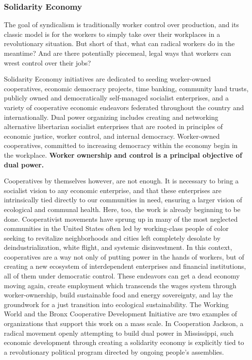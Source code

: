 \documentclass[10pt]{memoir}
\def \href #1#2{#2} %
\begin{document}
\subsubsection{Solidarity Economy}\label{solidarity-economy}

The goal of syndicalism is traditionally worker control over production,
and its classic model is for the workers to simply take over their
workplaces in a revolutionary situation. But short of that, what can
radical workers do in the meantime? And are there potentially piecemeal,
legal ways that workers can wrest control over their jobs?

Solidarity Economy initiatives are dedicated to seeding worker-owned
cooperatives, economic democracy projects, time banking, community land
trusts, publicly owned and democratically self-managed socialist
enterprises, and a variety of cooperative economic endeavors federated
throughout the country and internationally. Dual power organizing
includes creating and networking alternative libertarian socialist
enterprises that are rooted in principles of economic justice, worker
control, and internal democracy. Worker-owned cooperatives, committed to
increasing democracy within the economy begin in the workplace.
\textbf{Worker ownership and control is a principal objective of dual
power.}

Cooperatives by themselves however, are not enough. It is necessary to
bring a socialist vision to any economic enterprise, and that these
enterprises are intrinsically tied directly to our communities in need,
ensuring a larger vision of ecological and communal health. Here, too,
the work is already beginning to be done. Cooperativist movements have
sprung up in many of the most neglected communities in the United States
often led by working-class people of color seeking to revitalize
neighborhoods and cities left completely desolate by
deindustrialization, white flight, and systemic disinvestment. In this
context, cooperatives are a way not only of putting power in the hands
of workers, but of creating a new ecosystem of interdependent
enterprises and financial institutions, all of them under democratic
control. These endeavors can get a dead economy moving again, create
employment which transcends the wages system through worker-ownership,
build sustainable food and energy sovereignty, and lay the groundwork
for a just transition into ecological sustainability.
\href{https://www.theworkingworld.org/us/}{The Working World} and the
\href{https://bcdi.nyc/}{Bronx Cooperative Development Initiative} are
two examples of organizations that support this work on a mass scale. In
\href{https://cooperationjackson.org/}{Cooperation Jackson}, a radical
movement openly attempting to build dual power in Mississippi, such
economic development through creating a solidarity economy is
\href{https://static1.squarespace.com/static/59826532e6f2e1038a2870ff/t/5b6655c86d2a73ce52f8d6ce/1533433296830/Jackson-Kush+Plan.pdf}{explicitly
tied} to a revolutionary political program directed by ongoing people's
assemblies.
\end{document}
